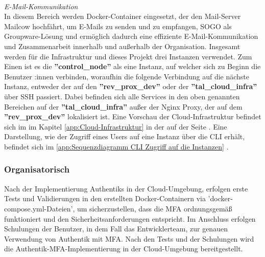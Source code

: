 \\\textit{E-Mail-Kommunikation}
\\In diesem Bereich werden Docker-Container eingesetzt, der den Mail-Server Mailcow hochfährt, um E-Mails zu senden und 
zu empfangen, SOGO als Groupware-Lösung und ermöglich dadurch eine effiziente E-Mail-Kommunikation und Zusammenarbeit innerhalb 
und außerhalb der Organisation.
Insgesamt werden für die Infrastruktur und dieses Projekt drei Instanzen verwendet. Zum Einen ist es die \textbf{''control\_node''} 
als eine Instanz, auf welcher sich zu Beginn die Benutzer :innen verbinden, woraufhin die folgende Verbindung auf die nächste Instanz, 
entweder der auf den \textbf{''rev\_prox\_dev''} oder der \textbf{''tal\_cloud\_infra''} über SSH passiert. Dabei befinden 
sich alle Services in den oben genannten Bereichen auf der \textbf{''tal\_cloud\_infra''} außer 
der Nginx Proxy, der auf dem \textbf{''rev\_prox\_dev''} lokalisiert ist. Eine Vorschau der Cloud-Infrastruktur befindet 
sich im  im Kapitel \ref{app:Cloud-Infrastruktur} in der  auf der Seite 
\pageref{app:Cloud-Infrastruktur}. Eine Darstellung, wie der Zugriff eines Users auf eine Instanz über die CLI erhält, 
befindet sich im  \ref*{app:Sequenzdiagramm CLI Zugriff auf die Instanzen} .

\subsubsection{Organisatorisch}
\label{sec:Organisatorisch}
Nach der Implementierung Authentiks in der Cloud-Umgebung, erfolgen erste Tests und Validierungen in den erstellten 
Docker-Containern via 'docker-compose.yml-Dateien', um sicherzustellen, dass die MFA ordnungsgemäß funktioniert und den 
Sicherheitsanforderungen entspricht. 
Im Anschluss erfolgen Schulungen der Benutzer, in dem Fall das Entwicklerteam, zur genauen Verwendung von Authentik mit MFA. 
Nach den Tests und der Schulungen wird die Authentik-MFA-Implementierung in der Cloud-Umgebung bereitgestellt.

